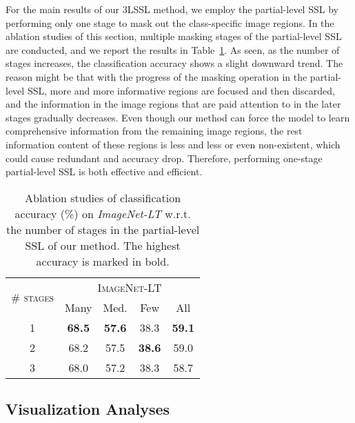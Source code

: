 \documentclass[10pt,journal,compsoc]{IEEEtran}
\begin{document}
For the main results of our 3LSSL method, we employ the partial-level SSL by performing only one stage to mask out the class-specific image regions. In the ablation studies of this section, multiple masking stages of the partial-level SSL are conducted, and we report the results in Table~\ref{table:multistageSSL}. As seen, as the number of stages increases, the classification accuracy shows a slight downward trend. The reason might be that with the progress of the masking operation in the partial-level SSL, more and more informative regions are focused and then discarded, and the information in the image regions that are paid attention to in the later stages gradually decreases. Even though our method can force the model to learn comprehensive information from the remaining image regions, the rest information content of these regions is less and less or even non-existent, which could cause redundant and accuracy drop. Therefore, performing one-stage partial-level SSL is both effective and efficient.

\begin{table}[t]
\centering
\small
\renewcommand\arraystretch{1.1}
\caption{\small Ablation studies of classification accuracy (\%) on \emph{ImageNet-LT} w.r.t. the number of stages in the partial-level SSL of our method. The highest accuracy is marked in bold.}
\begin{tabular}{c|cccc}
\toprule
\multirow{2}{*}{\textsc{\# stages}} & \multicolumn{4}{c}{\textsc{ImageNet-LT}}                    \\
                                    & \textsf{Many} & \textsf{Med.} & \textsf{Few} & \textsf{All} \\
\hline
1                                   & \textbf{68.5}          & \textbf{57.6}          & 38.3         & \textbf{59.1}      \bigstrut[t] \\
2                                   & 68.2          & 57.5          & \textbf{38.6}         & 59.0         \\
3                                   & 68.0          & 57.2          & 38.3         & 58.7        \\
\bottomrule           
\end{tabular}
\label{table:multistageSSL}
\end{table}


\subsection{Visualization Analyses}
\end{document}
